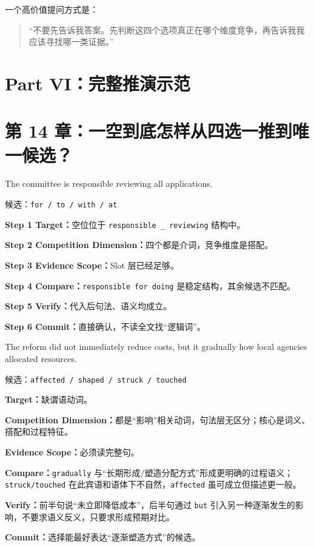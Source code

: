 \documentclass[11pt,a4paper]{ctexart}
\newcommand{\kw}[1]{\textbf{#1}}
\begin{document}
一个高价值提问方式是：
\begin{quote}
“不要先告诉我答案。先判断这四个选项真正在哪个维度竞争，再告诉我我应该寻找哪一类证据。”
\end{quote}

\newpage
\section{Part VI：完整推演示范}

\section{第 14 章：一空到底怎样从四选一推到唯一候选？}

\begin{eng}
The committee is responsible \underline{\hspace{1.1cm}} reviewing all applications.

候选：\texttt{for / to / with / at}
\end{eng}
\kw{Step 1 Target：}空位位于 \texttt{responsible \_ reviewing} 结构中。\par
\kw{Step 2 Competition Dimension：}四个都是介词，竞争维度是搭配。\par
\kw{Step 3 Evidence Scope：}Slot 层已经足够。\par
\kw{Step 4 Compare：}\texttt{responsible for doing} 是稳定结构，其余候选不匹配。\par
\kw{Step 5 Verify：}代入后句法、语义均成立。\par
\kw{Step 6 Commit：}直接确认，不读全文找“逻辑词”。

\begin{eng}
The reform did not immediately reduce costs, but it gradually \underline{\hspace{1.1cm}} how local agencies allocated resources.

候选：\texttt{affected / shaped / struck / touched}
\end{eng}
\kw{Target：}缺谓语动词。\par
\kw{Competition Dimension：}都是“影响”相关动词，句法层无区分；核心是词义、搭配和过程特征。\par
\kw{Evidence Scope：}必须读完整句。\par
\kw{Compare：}\texttt{gradually} 与“长期形成/塑造分配方式”形成更明确的过程语义；\texttt{struck/touched} 在此宾语和语体下不自然，\texttt{affected} 虽可成立但描述更一般。\par
\kw{Verify：}前半句说“未立即降低成本”，后半句通过 \texttt{but} 引入另一种逐渐发生的影响，不要求语义反义，只要求形成预期对比。\par
\kw{Commit：}选择能最好表达“逐渐塑造方式”的候选。
\end{document}

